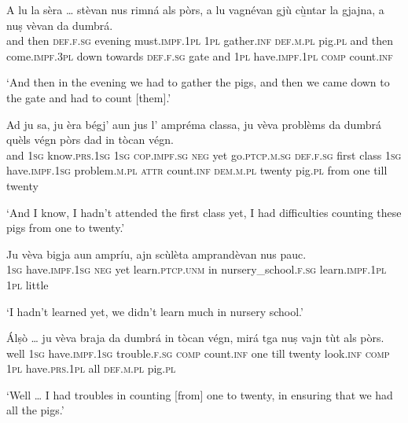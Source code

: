 \begin{linenumbers}
	\gll    A lu la sèra … stèvan nus rimná als pòrs, a lu vagnévan gjù cù̱ntar la gjajna, a nuṣ vèvan da dumbrá. \\
	and then \textsc{def.f.sg} evening {}  must.\textsc{impf.1pl} \textsc{1pl} gather.\textsc{inf} \textsc{def.m.pl} pig.\textsc{pl} and then come.\textsc{impf.3pl} down towards \textsc{def.f.sg} gate and \textsc{1pl} have.\textsc{impf.1pl}  \textsc{comp} count.\textsc{inf}\\
\end{linenumbers}
\medskip
\glt `And then in the evening we had to gather the pigs, and then we came down to the gate and had to count [them].'
\medskip

\begin{linenumbers}
	\gll    Ad ju sa, ju èra bégj’ aun jus l’ ampréma classa, ju vèva problèms da dumbrá quèls végn pòrs dad in tòcan végn.\\
	and  \textsc{1sg} know.\textsc{prs.1sg} \textsc{1sg} \textsc{cop.impf.sg} \textsc{neg} yet go.\textsc{ptcp.m.sg} \textsc{def.f.sg} first class \textsc{1sg} have.\textsc{impf.1sg} problem.\textsc{m.pl} \textsc{attr} count.\textsc{inf} \textsc{dem.m.pl} twenty pig.\textsc{pl} from one till twenty\\
\end{linenumbers}
\medskip
\glt `And I know, I hadn’t attended the first class yet, I had difficulties counting these pigs from one to twenty.'
\medskip

\largerpage
\begin{linenumbers}
\gll  Ju vèva bigja aun ampríu, ajn scùlèta amprandèvan nus pauc.\\
\textsc{1sg} have.\textsc{impf.1sg} \textsc{neg} yet  learn.\textsc{ptcp.unm} in  nursery\_school.\textsc{f.sg} learn.\textsc{impf.1pl}  \textsc{1pl} little \\
\end{linenumbers}
\medskip
\glt `I hadn’t learned yet, we didn’t learn much in nursery school.'
\medskip

\begin{linenumbers}
	\gll    Álṣò … ju vèva braja da dumbrá in tòcan végn, mirá tga nuṣ vajn tùt als pòrs.\\
	well {} \textsc{1sg}  have.\textsc{impf.1sg} trouble.\textsc{f.sg}  \textsc{comp} count.\textsc{inf} one till twenty  look.\textsc{inf} \textsc{comp} \textsc{1pl} have.\textsc{prs.1pl} all \textsc{def.m.pl} pig.\textsc{pl}\\
\end{linenumbers}
\medskip
\glt `Well … I had troubles in counting [from] one to twenty, in ensuring that we had all the pigs.'
\clearpage



